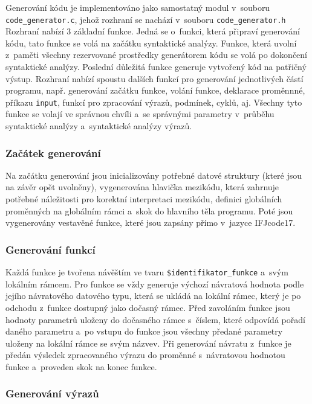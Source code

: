 \documentclass[a4paper, 11pt]{article}
\begin{document}
	Generování kódu je implementováno jako samostatný modul v~souboru \texttt{code\_generator.c},
	jehož rozhraní se nachází v~souboru \texttt{code\_generator.h} Rozhraní nabízí 3 základní funkce.
	Jedná se o~funkci, která připraví generování kódu, tato funkce se volá na začátku syntaktické analýzy.
	Funkce, která uvolní z~paměti všechny rezervované prostředky generátorem kódu se volá po dokončení
	syntaktické analýzy. Poslední důležitá funkce generuje vytvořený kód na patřičný výstup. Rozhraní
	nabízí spoustu dalších funkcí pro generování jednotlivých částí programu, např. generování začátku
	funkce, volání funkce, deklarace proměnnné, příkazu \texttt{input}, funkcí pro zpracování výrazů,
	podmínek, cyklů, aj. Všechny tyto funkce se volají ve správnou chvíli a~se správnými
	parametry v~průběhu syntaktické analýzy a~syntaktické analýzy výrazů.

	\subsubsection{Začátek generování}

	Na začátku generování jsou inicializovány potřebné datové struktury (které jsou na závěr
	opět uvolněny), vygenerována hlavička mezikódu, která zahrnuje potřebné náležitosti pro korektní
	interpretaci mezikódu, definici globálních proměnných na globálním rámci a~skok do hlavního
	těla programu. Poté jsou vygenerovány vestavěné funkce, které jsou zapsány přímo v~jazyce IFJcode17.

	\subsubsection{Generování funkcí}

	Každá funkce je tvořena návěštím ve tvaru \texttt{\$identifikator\_funkce} a~svým lokálním rámcem.
	Pro funkce se vždy generuje výchozí návratová hodnota podle jejího návratového datového typu,
	která se ukládá na lokální rámec, který je po odchodu z~funkce dostupný jako dočasný rámec.
	Před zavoláním funkce jsou hodnoty parametrů uloženy do dočasného rámce s~číslem, které
	odpovídá pořadí daného parametru a~po vstupu do funkce jsou všechny předané parametry uloženy na
	lokální rámce se svým názvev. Při generování návratu z~funkce je předán výsledek zpracovaného
	výrazu do proměnné s~návratovou hodnotou funkce a~proveden skok na konec funkce.

	\subsubsection{Generování výrazů}
\end{document}
